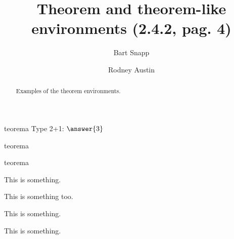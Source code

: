 \documentclass{ximera}
\author{Bart Snapp \and Rodney Austin}
\title[Examples:]{Theorem and theorem-like environments (2.4.2, pag. 4)}
\begin{document}
\begin{abstract}
  Examples of the theorem environments.
\end{abstract}
\maketitle


\lipsum[1]

\begin{thm}
teorema \lipsum[1]
Type 2+1: $\answer{3}$
\end{thm}

\vspace*{1ex}

\lipsum[1]

\begin{thm}[título]
teorema \lipsum[1]
\end{thm}

\lipsum[1]

\begin{prp}[título]
teorema \lipsum[1]
\end{prp}

\lipsum[1]

\begin{theorem}
  This is something.\lipsum[1]
\end{theorem}

\lipsum[1]

\begin{theorem}[My theorem]
  This is something too.
\end{theorem}

\begin{algorithm}
  This is something.
\end{algorithm}

\begin{axiom}
  This is something.
\end{axiom}
\end{document}
